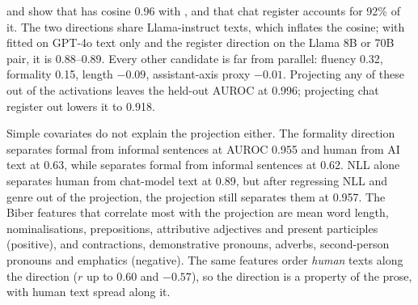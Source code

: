 \begin{table}[t]
\centering
\caption{Geometry at layer 12 of the instruct model. ``AUROC after removal'' is the held-out human-vs-chat AUROC after projecting the candidate out of the activations and refitting. ``Share removed'' is the share of \airead inside the candidate's span.}
\label{tab:geometry}
\end{table}

 and  show that \airead has cosine 0.96 with \chatreg, and that chat register accounts for 92\% of it.
The two directions share Llama-instruct texts, which inflates the cosine; with \airead fitted on GPT-4o text only and the register direction on the Llama 8B or 70B pair, it is 0.88--0.89.
Every other candidate is far from parallel: fluency 0.32, formality 0.15, length $-0.09$, assistant-axis proxy $-0.01$.
Projecting any of these out of the activations leaves the held-out AUROC at 0.996; projecting chat register out lowers it to 0.918.

Simple covariates do not explain the projection either.
The formality direction separates formal from informal sentences at AUROC 0.955 and human from AI text at 0.63, while \airead separates formal from informal sentences at 0.62.
NLL alone separates human from chat-model text at 0.89, but after regressing NLL and genre out of the projection, the projection still separates them at 0.957.
The Biber features \citep{biber1988variation} that correlate most with the projection are mean word length, nominalisations, prepositions, attributive adjectives and present participles (positive), and contractions, demonstrative pronouns, adverbs, second-person pronouns and emphatics (negative).
The same features order {\em human} texts along the direction ($r$ up to 0.60 and $-0.57$), so the direction is a property of the prose, with human text spread along it.


